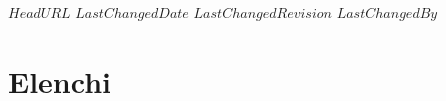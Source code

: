 \svnidlong
{$HeadURL$}
{$LastChangedDate$}
{$LastChangedRevision$}
{$LastChangedBy$}

\chapter{Elenchi}
\begin{multicols}{2}
	\listofdefines
	\listoftheoremas
\end{multicols}
\begin{comment}

\chapter{Elenchi ...}
\labelChapter{elenchi}

\begin{introduction}
‘‘BEEP BOOP INSERIRE CITAZIONE QUA BEEP BOOP.''
\begin{flushright}
	\textsc{NON UN ROBOT,} UN UMANO IN CARNE ED OSSA BEEP BOOP.
\end{flushright}
\end{introduction}

\noindent Elenchiamo, separati per capitoli, i principali teoremi e proposizioni.

\end{comment}
